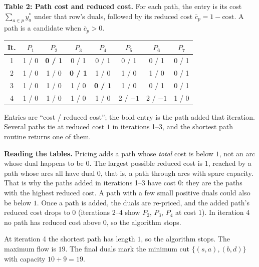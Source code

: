 \documentclass[11pt]{article}
\begin{document}
\textbf{Table 2: Path cost and reduced cost.} For each path, the entry is its cost $\sum_{a\in p}y^*_a$ under that row's duals, followed by its reduced cost $\bar c_p = 1-\text{cost}$. A path is a candidate when $\bar c_p>0$.
\begin{center}
\footnotesize
\setlength{\tabcolsep}{4pt}
\begin{tabular}{@{}cccccccc@{}}
\toprule
It. & $P_1$ & $P_2$ & $P_3$ & $P_4$ & $P_5$ & $P_6$ & $P_7$ \\
\midrule
1 & 1 / 0 & \textbf{0 / 1} & 0 / 1 & 0 / 1 & 0 / 1 & 0 / 1 & 0 / 1 \\
2 & 1 / 0 & 1 / 0 & \textbf{0 / 1} & 1 / 0 & 1 / 0 & 1 / 0 & 0 / 1 \\
3 & 1 / 0 & 1 / 0 & 1 / 0 & \textbf{0 / 1} & 1 / 0 & 0 / 1 & 0 / 1 \\
4 & 1 / 0 & 1 / 0 & 1 / 0 & 1 / 0 & 2 / $-1$ & 2 / $-1$ & 1 / 0 \\
\bottomrule
\end{tabular}
\end{center}
Entries are ``cost / reduced cost''; the bold entry is the path added that iteration. Several paths tie at reduced cost $1$ in iterations 1--3, and the shortest path routine returns one of them.

\textbf{Reading the tables.} Pricing adds a path whose \emph{total} cost is below $1$, not an arc whose dual happens to be $0$. The largest possible reduced cost is $1$, reached by a path whose arcs all have dual $0$, that is, a path through arcs with spare capacity. That is why the paths added in iterations 1--3 have cost $0$: they are the paths with the highest reduced cost. A path with a few small positive duals could also be below $1$. Once a path is added, the duals are re-priced, and the added path's reduced cost drops to $0$ (iterations 2--4 show $P_2$, $P_3$, $P_4$ at cost $1$). In iteration 4 no path has reduced cost above $0$, so the algorithm stops.

At iteration 4 the shortest path has length $1$, so the algorithm stops. The maximum flow is $19$. The final duals mark the minimum cut $\{(s,a),(b,d)\}$ with capacity $10+9=19$.
\end{document}
